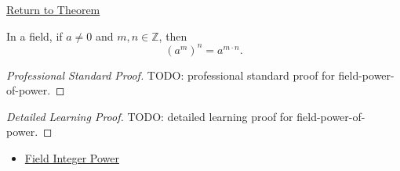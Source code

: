 \newpage
{}
\label{prf:field-power-of-power}

\begin{remark*}[Return]
\hyperref[def:integer-power-on-q]{Return to Theorem}
\end{remark*}

\begin{theorem*}
In a field, if $a\ne0$ and $m,n\in\mathbb{Z}$, then
\[
(a^m)^n=a^{m\cdot n}.
\]
\end{theorem*}

\begin{proof}[Professional Standard Proof]
\LRAProofBodyStart
TODO: professional standard proof for field-power-of-power.
\end{proof}

\begin{proof}[Detailed Learning Proof]
\LRAProofBodyStart
TODO: detailed learning proof for field-power-of-power.
\end{proof}

\begin{remark*}
\end{remark*}

\begin{dependencies}
\begin{itemize}
  \item \hyperref[def:two-sided-inverse]{Field Integer Power}
\end{itemize}
\end{dependencies}

\clearpage
